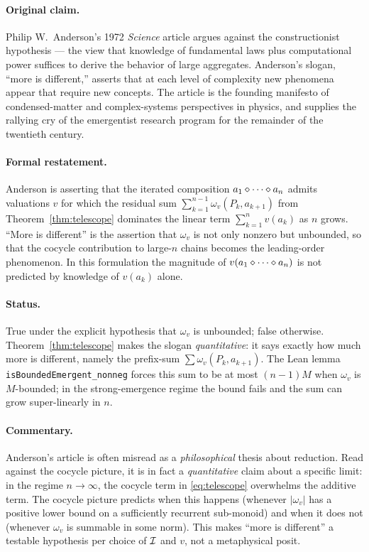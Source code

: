 \paragraph{Original claim.} Philip W.\ Anderson's 1972 \emph{Science}
article \cite{Anderson1972} argues against the constructionist hypothesis ---
the view that knowledge of fundamental laws plus computational power
suffices to derive the behavior of large aggregates. Anderson's slogan,
``more is different,'' asserts that at each level of complexity new
phenomena appear that require new concepts. The article is the founding
manifesto of condensed-matter and complex-systems perspectives in physics,
and supplies the rallying cry of the emergentist research program for the
remainder of the twentieth century.

\paragraph{Formal restatement.} Anderson is asserting that the iterated
composition $a_1 \mathbin{\diamond} \cdots \mathbin{\diamond} a_n$ admits valuations $v$ for
which the residual sum $\sum_{k=1}^{n-1} \omega_v(P_k, a_{k+1})$ from
Theorem~\ref{thm:telescope} dominates the linear term $\sum_{k=1}^n
v(a_k)$ as $n$ grows. ``More is different'' is the assertion that
$\omega_v$ is not only nonzero but unbounded, so that the cocycle
contribution to large-$n$ chains becomes the leading-order phenomenon. In
this formulation the magnitude of $v(a_1\mathbin{\diamond}\cdots\mathbin{\diamond} a_n)$ is
not predicted by knowledge of $v(a_k)$ alone.

\paragraph{Status.} True under the explicit hypothesis that $\omega_v$ is
unbounded; false otherwise. Theorem~\ref{thm:telescope} makes the slogan
\emph{quantitative}: it says exactly how much more is different, namely the
prefix-sum $\sum \omega_v(P_k, a_{k+1})$. The Lean lemma
\texttt{isBoundedEmergent\_nonneg} forces this sum to be at most $(n-1)M$
when $\omega_v$ is $M$-bounded; in the strong-emergence regime the bound
fails and the sum can grow super-linearly in $n$.

\paragraph{Commentary.} Anderson's article is often misread as a
\emph{philosophical} thesis about reduction. Read against the cocycle
picture, it is in fact a \emph{quantitative} claim about a specific limit:
in the regime $n \to \infty$, the cocycle term in \eqref{eq:telescope}
overwhelms the additive term. The cocycle picture predicts when this
happens (whenever $|\omega_v|$ has a positive lower bound on a sufficiently
recurrent sub-monoid) and when it does not (whenever $\omega_v$ is summable
in some norm). This makes ``more is different'' a testable hypothesis per
choice of $\mathcal{I}$ and $v$, not a metaphysical posit.

